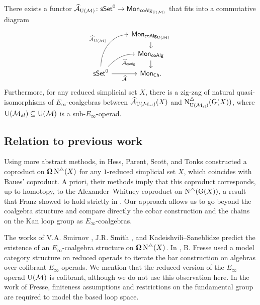 \begin{theorem} \label{t:2nd main thm in the intro} There exists a functor $\operatorname{\mathcal{\widehat{A}}}_{\operatorname{U}(\mathcal{M})} \colon \mathsf{sSet}^0 \to \mathsf{Mon}_{\mathsf{coAlg}_{\operatorname{U}(\mathcal{M})}}$ that fits into a commutative diagram
	\[
	\begin{tikzcd}[row sep=small]
	& \Mon_{\coAlg_\UM} \arrow[d] \\
	& \Mon_{\coAlg} \arrow[d] \\
	\sSet^0
	\arrow[r, "\Ahat"', ]
	\arrow[ru, "\Ahat_{\coAlg}"', out=45, in=180]
	\arrow[ruu, "\Ahat_\UM", out=90, in=180]
	& \Mon_{\Ch}.
	\end{tikzcd}
	\]
	Furthermore, for any reduced simplicial set $X$, there is a zig-zag of natural quasi-isomorphisms of $E_{\infty}$-coalgebras between $\operatorname{\mathcal{\widehat{A}}}_{\operatorname{U}(\mathcal{M}_{sl})}(X)$ and $\operatorname{N^{\triangle}_{{\operatorname{U}(\mathcal{M}_{sl})}}}(\operatorname{G}(X))$, where ${\operatorname{U}(\mathcal{M}_{sl})} \subseteq {\operatorname{U}(\mathcal{M})}$ is a sub-$E_\infty$-operad.
\end{theorem}

\subsection*{Relation to previous work}

Using more abstract methods, in \cite{hess2006adamshilton} Hess, Parent, Scott, and Tonks constructed a coproduct on $\operatorname{\mathbf{\Omega}} \operatorname{N^{\triangle}}(X)$ for any $1$-reduced simplicial set $X$, which coincides with Baues' coproduct.
A priori, their methods imply that this coproduct corresponds, up to homotopy, to the Alexander--Whitney coproduct on $\operatorname{N^{\triangle}}(\operatorname{G}(X))$, a result that Franz showed to hold strictly in \cite{franz2020szczarba}.
Our approach allows us to go beyond the coalgebra structure and compare directly the cobar construction and the chains on the Kan loop group as $E_{\infty}$-coalgebras.

The works of V.A. Smirnov \cite{smirnov1990iterated}, J.R. Smith \cite{smith1994cobar, smith2000operads}, and Kadeishvili–Saneblidze \cite{kadeishvili1998iterating} predict the existence of an $E_\infty$-coalgebra structure on $\operatorname{\mathbf{\Omega}} \operatorname{N^{\triangle}}(X)$.
In \cite{fresse2010bar}, B. Fresse used a model category structure on reduced operads \cite{berger2003modelcategory, hinich1997homologicalalgebra} to iterate the bar construction on algebras over cofibrant $E_\infty$-operads.
We mention that the reduced version of the $E_{\infty}$-operad ${\operatorname{U}(\mathcal{M})}$ is cofibrant, although we do not use this observation here.
In the work of Fresse, finiteness assumptions and restrictions on the fundamental group are required to model the based loop space.

